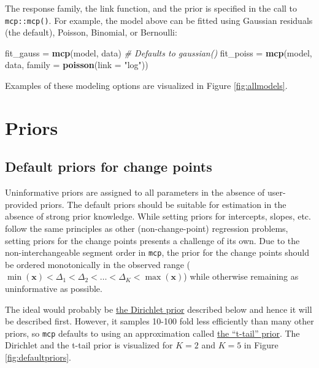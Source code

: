 \documentclass[
  american,
]{article}
\newenvironment{Shaded}{\begin{snugshade}}{\end{snugshade}}
\newcommand{\CommentTok}[1]{\textcolor[rgb]{0.56,0.35,0.01}{\textit{#1}}}
\newcommand{\DataTypeTok}[1]{\textcolor[rgb]{0.13,0.29,0.53}{#1}}
\newcommand{\KeywordTok}[1]{\textcolor[rgb]{0.13,0.29,0.53}{\textbf{#1}}}
\newcommand{\NormalTok}[1]{#1}
\newcommand{\StringTok}[1]{\textcolor[rgb]{0.31,0.60,0.02}{#1}}
\begin{document}
The response family, the link function, and the prior is specified in the call to \texttt{mcp::mcp()}. For example, the model above can be fitted using Gaussian residuals (the default), Poisson, Binomial, or Bernoulli:

\begin{Shaded}
\begin{Highlighting}[]
\NormalTok{fit_gauss =}\StringTok{ }\KeywordTok{mcp}\NormalTok{(model, data)  }\CommentTok{# Defaults to gaussian()}
\NormalTok{fit_poiss =}\StringTok{ }\KeywordTok{mcp}\NormalTok{(model, data, }\DataTypeTok{family =} \KeywordTok{poisson}\NormalTok{(}\DataTypeTok{link =} \StringTok{"log"}\NormalTok{))}
\end{Highlighting}
\end{Shaded}

Examples of these modeling options are visualized in Figure \ref{fig:allmodels}.

\hypertarget{priors}{%
\section{Priors}\label{priors}}

\hypertarget{default-priors-for-change-points}{%
\subsection{Default priors for change points}\label{default-priors-for-change-points}}

Uninformative priors are assigned to all parameters in the absence of user-provided priors. The default priors should be suitable for estimation in the absence of strong prior knowledge. While setting priors for intercepts, slopes, etc. follow the same principles as other (non-change-point) regression problems, setting priors for the change points presents a challenge of its own. Due to the non-interchangeable segment order in \texttt{mcp}, the prior for the change points should be ordered monotonically in the observed range (\(\min(\mathbf{x}) < \Delta_1 < \Delta_2 < \ldots < \Delta_K < \max(\mathbf{x})\)) while otherwise remaining as uninformative as possible.

The ideal would probably be \protect\hyperlink{dirichlet}{the Dirichlet prior} described below and hence it will be described first. However, it samples 10-100 fold less efficiently than many other priors, so \texttt{mcp} defaults to using an approximation called \protect\hyperlink{t-tail}{the ``t-tail'' prior}. The Dirichlet and the t-tail prior is visualized for \(K = 2\) and \(K = 5\) in Figure \ref{fig:defaultpriors}.
\end{document}
